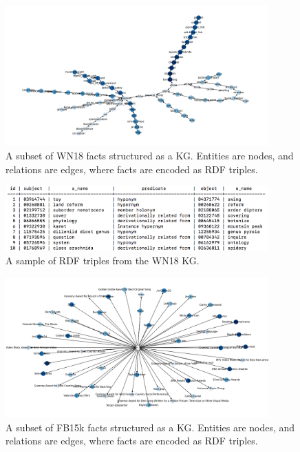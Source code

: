 \begin{figure}
   	\centering
    	\includegraphics[width=0.9\textwidth, height=0.6\textwidth]{WN18_Graph}
	\captionsetup{justification=centering}
	\caption{A subset of WN18 facts structured as a KG. Entities are nodes, and relations are edges, where facts are encoded as RDF triples.}
\end{figure}

\begin{figure}
   	\centering
    	\includegraphics[width=0.9\textwidth, height=0.3\textwidth]{wn18_fact_sample}
	\captionsetup{justification=centering}
	\caption{A sample of RDF triples from the WN18 KG.}
\end{figure}

\begin{figure}[H]
   	\centering
    	\includegraphics[width=0.9\textwidth, height=0.6\textwidth]{FB15k_Graph}
	\captionsetup{justification=centering}
	\caption{A subset of FB15k facts structured as a KG. Entities are nodes, and relations are edges, where facts are encoded as RDF triples.}
\end{figure}

